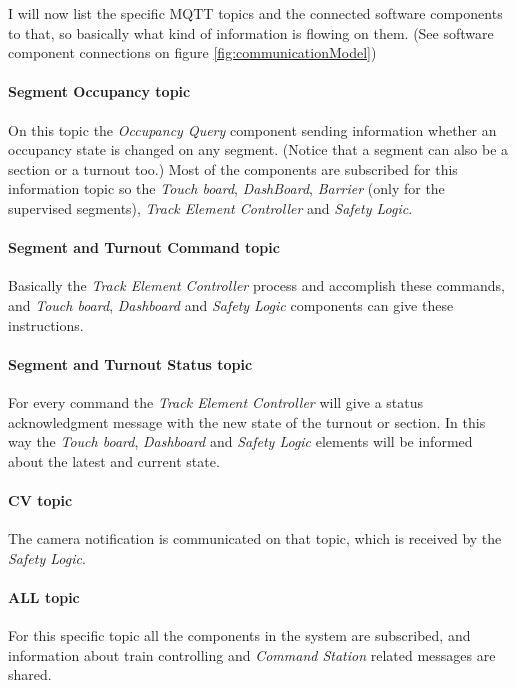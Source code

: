 I will now list the specific MQTT topics and the connected software components to that, so basically what kind of information is flowing on them. (See software component connections on figure \ref{fig:communicationModel})

\paragraph{Segment Occupancy topic}
On this topic the \textit{Occupancy Query} component sending information whether an occupancy state is changed on any segment. (Notice that a segment can also be a section or a turnout too.) Most of the components are subscribed for this information topic so the \textit{Touch board}, \textit{DashBoard}, \textit{Barrier} (only for the supervised segments), \textit{Track Element Controller} and \textit{Safety Logic}.

\paragraph{Segment and Turnout Command topic}\label{par:MQTTTopicCommand}
Basically the \textit{Track Element Controller} process and accomplish these commands, and \textit{Touch board}, \textit{Dashboard} and \textit{Safety Logic} components can give these instructions.

\paragraph{Segment and Turnout Status topic}\label{par:MQTTTopicStatus}
For every command the \textit{Track Element Controller} will give a status acknowledgment message with the new state of the turnout or section. In this way the \textit{Touch board}, \textit{Dashboard} and \textit{Safety Logic} elements will be informed about the latest and current state.

\paragraph{CV topic}
The camera notification is communicated on that topic, which is received by the \textit{Safety Logic}.

\paragraph{ALL topic}
For this specific topic all the components in the system are subscribed, and information about train controlling and \textit{Command Station} related messages are shared.


